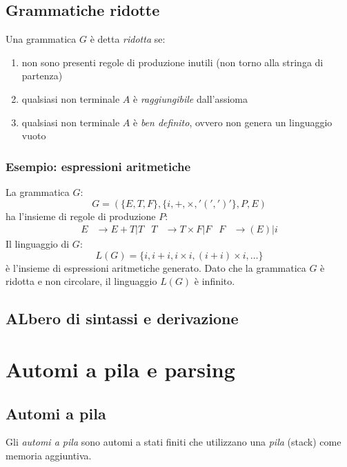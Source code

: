 \documentclass[11pt]{article}
\begin{document}
\subsection{Grammatiche ridotte}
Una grammatica $G$ è detta \textit{ridotta} se:
\begin{enumerate}
    \item non sono presenti regole di produzione inutili (non torno alla stringa di partenza)
    \item qualsiasi non terminale $A$ è \textit{raggiungibile} dall'assioma 
    \item qualsiasi non terminale $A$ è \textit{ben definito}, ovvero non genera un linguaggio vuoto
\end{enumerate}
\subsubsection*{Esempio: espressioni aritmetiche}
La grammatica $G$:
\begin{equation*}
    G=(\{E,T,F\},\{i,+,\times,'(',')'\},P,E)
\end{equation*}
ha l'insieme di regole di produzione $P$:
\begin{align*}
    E&\rightarrow E+T|T & T&\rightarrow T\times F|F & F&\rightarrow (E)|i
\end{align*}
Il linguaggio di $G$:
\begin{equation*}
    L(G)=\{i,i+i,i\times i,(i+i)\times i,\dots\}
\end{equation*}
è l'insieme di espressioni aritmetiche generato. Dato che la grammatica $G$ è ridotta e non circolare, il linguaggio 
$L(G)$ è infinito.
\subsection{ALbero di sintassi e derivazione}





















\section{Automi a pila e parsing}
\subsection{Automi a pila}
Gli \textit{automi a pila} sono automi a stati finiti che utilizzano una \textit{pila} (stack) come memoria aggiuntiva.
\end{document}
